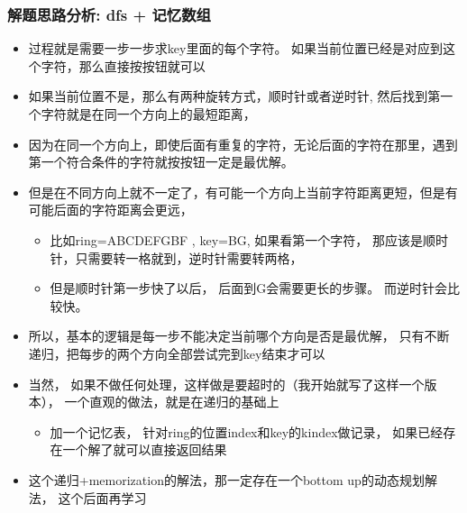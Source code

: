 \documentclass[9pt, b5paper]{article}
\begin{document}
\subsubsection{解题思路分析: dfs + 记忆数组}
\label{sec-4-3-3}
\begin{itemize}
\item 过程就是需要一步一步求key里面的每个字符。 如果当前位置已经是对应到这个字符，那么直接按按钮就可以
\item 如果当前位置不是，那么有两种旋转方式，顺时针或者逆时针, 然后找到第一个字符就是在同一个方向上的最短距离，
\item 因为在同一个方向上，即使后面有重复的字符，无论后面的字符在那里，遇到第一个符合条件的字符就按按钮一定是最优解。
\item 但是在不同方向上就不一定了，有可能一个方向上当前字符距离更短，但是有可能后面的字符距离会更远，
\begin{itemize}
\item 比如ring=ABCDEFGBF , key=BG, 如果看第一个字符， 那应该是顺时针，只需要转一格就到，逆时针需要转两格，
\item 但是顺时针第一步快了以后， 后面到G会需要更长的步骤。 而逆时针会比较快。
\end{itemize}
\item 所以，基本的逻辑是每一步不能决定当前哪个方向是否是最优解， 只有不断递归，把每步的两个方向全部尝试完到key结束才可以
\item 当然， 如果不做任何处理，这样做是要超时的（我开始就写了这样一个版本）， 一个直观的做法，就是在递归的基础上
\begin{itemize}
\item 加一个记忆表， 针对ring的位置index和key的kindex做记录， 如果已经存在一个解了就可以直接返回结果
\end{itemize}
\item 这个递归+memorization的解法，那一定存在一个bottom up的动态规划解法， 这个后面再学习
\end{itemize}
\end{document}
